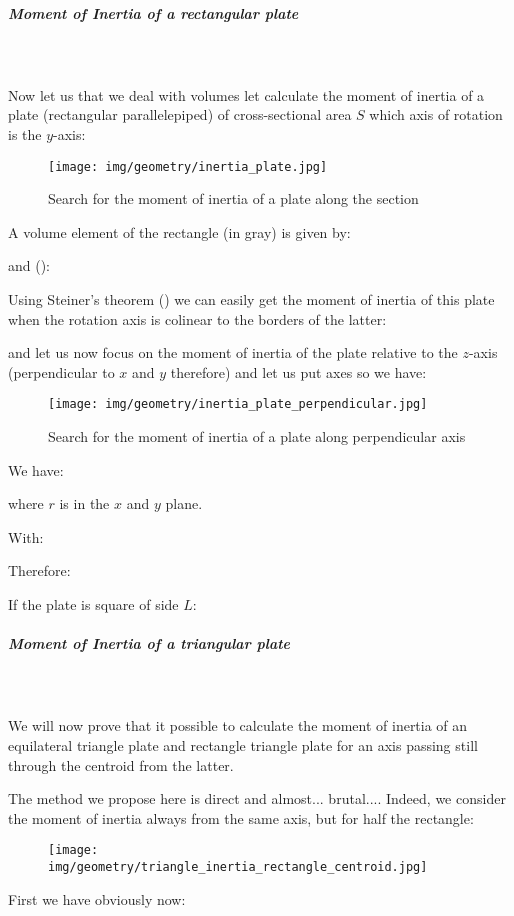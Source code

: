 {	\subparagraph{Moment of Inertia of a rectangular plate}\mbox{}\\\\
	Now let us that we deal with volumes let calculate the moment of inertia of a plate (rectangular parallelepiped) of cross-sectional area $S$ which axis of rotation is the $y$-axis:
	\begin{figure}[H]
		\centering
		\texttt{[image: img/geometry/inertia\_plate.jpg]}
		\caption{Search for the moment of inertia of a plate along the section}
	\end{figure}
	A volume element of the rectangle (in gray) is given by:
	
	and ():
	
	Using Steiner's theorem ()  we can easily get the moment of inertia of this plate when the rotation axis is colinear to the borders of the latter:
	
	and let us now focus on the moment of inertia of the plate relative to the $z$-axis (perpendicular to $x$ and $y$ therefore) and let us put axes so we have:
	\begin{figure}[H]
		\centering
		\texttt{[image: img/geometry/inertia\_plate\_perpendicular.jpg]}
		\caption{Search for the moment of inertia of a plate along perpendicular axis}
	\end{figure}
	We have:
	
	where $r$ is in the $x$ and $y$ plane.
	
	With:
	
	Therefore:
	
	If the plate is square of side $L$:
	
	
	\pagebreak
	\subparagraph{Moment of Inertia of a triangular plate}\mbox{}\\\\
	We will now prove that it possible to calculate the moment of inertia of an equilateral triangle plate and rectangle triangle plate for an axis passing still through the centroid from the latter.
	
	The method we propose here is direct and almost... brutal.... Indeed, we consider the moment of inertia always from the same axis, but for half the rectangle:
	\begin{figure}[H]
		\centering
		\texttt{[image: img/geometry/triangle\_inertia\_rectangle\_centroid.jpg]}
	\end{figure}	
	 First we have obviously now:
	
}
